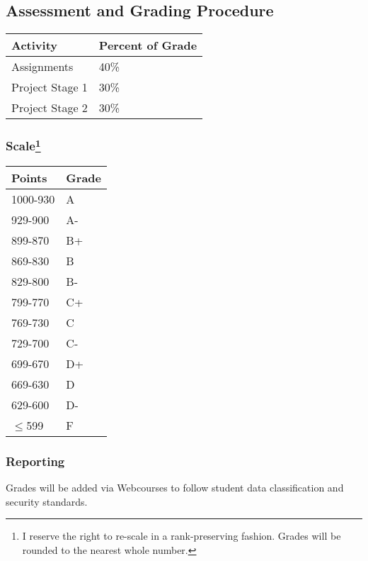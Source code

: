 \documentclass[11pt]{paper}
\begin{document}


\subsection*{Assessment and Grading Procedure}

\begin{flushleft}
\begin{tabular}{ l  l }\hline
 Activity & Percent of Grade \\\hline 
 Assignments &  40\% \\
 Project Stage 1 & 30\% \\
 Project Stage 2 & 30\% \\\hline
\end{tabular}
\end{flushleft}

\subsubsection*{Scale\footnote{I reserve the right to re-scale in a rank-preserving fashion. Grades will be rounded to the nearest whole number.}}
\begin{flushleft}
\begin{tabular}{ l  l }\hline
 Points & Grade \\\hline 
 1000-930 &  A \\
 929-900 & A-\\
 899-870 & B+ \\
 869-830 & B \\
 829-800 & B- \\
 799-770 & C+ \\
 769-730 & C \\
 729-700 & C- \\
 699-670 & D+ \\
 669-630 & D \\
 629-600 & D- \\
 $\leq$599 & F \\\hline
\end{tabular}
\end{flushleft}

\subsubsection*{Reporting}
Grades will be added via Webcourses to follow student data classification and security standards.
\end{document}

